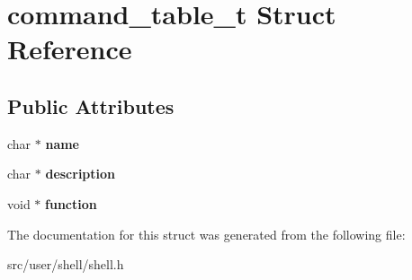 \hypertarget{structcommand__table__t}{}\section{command\+\_\+table\+\_\+t Struct Reference}
\label{structcommand__table__t}
\subsection*{Public Attributes}
\begin{DoxyCompactItemize}
\item 
\mbox{\label{structcommand__table__t_a321ec606d6c9bf08a1737d43b0750650}} 
char $\ast$ {\bfseries name}
\item 
\mbox{\label{structcommand__table__t_a4d4303d3a281d64cade072f97b5afd69}} 
char $\ast$ {\bfseries description}
\item 
\mbox{\label{structcommand__table__t_a48a07e98ca083903630cf75d265a6dd9}} 
void $\ast$ {\bfseries function}
\end{DoxyCompactItemize}


The documentation for this struct was generated from the following file\+:\begin{DoxyCompactItemize}
\item 
src/user/shell/shell.\+h\end{DoxyCompactItemize}
